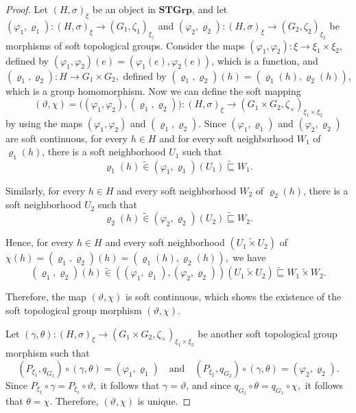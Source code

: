 \documentclass[preprint,12pt]{elsarticle}
\begin{document}
\begin{proof}
 Let $ (H, \sigma)_\xi $ be an object in $\mathbf{STGrp}$, and let $(\varphi_1, \varrho_1): (H, \sigma)_\xi\to (G_1,\zeta_1 )_{\xi_1}$ and $(\varphi_2, \varrho_2): (H, \sigma)_\xi \to (G_2,\zeta_2 )_{\xi_2}$ be morphisms of soft topological groups. Consider the maps
\(
(\varphi_1, \varphi_2) : \xi \to \xi_1 \times \xi_2,
\)
defined by
\(
(\varphi_1, \varphi_2)(e) = (\varphi_1(e), \varphi_2(e))
\), which is a function, and \(
(\varrho_1, \varrho_2) : H \to G_1 \times G_2,
\)
defined by
\(
(\varrho_1, \varrho_2)(h) = (\varrho_1(h), \varrho_2(h))
\), which is a group homomorphism.
Now we can define the soft mapping
\[
(\vartheta, \chi) = \big( (\varphi_1, \varphi_2), (\varrho_1, \varrho_2) \big) :( H, \sigma)_ \xi \to ( G_1 \times G_2, \zeta_\times)_ {\xi_1 \times \xi_2}
\] by using the maps $(\varphi_1, \varphi_2)$ and $(\varrho_1, \varrho_2)$.
Since $(\varphi_1, \varrho_1)$ and $(\varphi_2, \varrho_2)$ are soft continuous, for every \( h \in H \) and for every soft neighborhood \( W_1 \) of \( \varrho_1(h) \), there is a soft neighborhood \( U_1 \) such that
\[
\varrho_1(h)  \widetilde{\in}(\varphi_1, \varrho_1)(U_1)  \widetilde{\sqsubseteq}W_1.
\]

Similarly, for every \( h \in H \) and every soft neighborhood \( W_2 \) of \( \varrho_2(h) \), there is a soft neighborhood \( U_2 \) such that
\[
\varrho_2(h)  \widetilde{\in}(\varphi_2, \varrho_2)(U_2) \widetilde{\sqsubseteq }W_2.
\]

Hence, for every \( h \in H \) and every soft neighborhood \( (U_1\widetilde{\times} U_2) \) of
\(
\chi(h) = (\varrho_1, \varrho_2)(h) = (\varrho_1(h), \varrho_2(h)),
\)
we have
\[
(\varrho_1, \varrho_2)(h)  \widetilde{\in}((\varphi_1, \varrho_1), (\varphi_2, \varrho_2))(U_1\widetilde{\times} U_2)  \widetilde{\sqsubseteq } W_1\widetilde{\times} W_2.
\]

Therefore, the map \( (\vartheta, \chi) \) is soft continuous, which shows the existence of the soft topological group morphism \( (\vartheta, \chi) \).

Let \( (\gamma, \theta): ( H, \sigma)_ \xi \to ( G_1 \times G_2, \zeta_\times)_ {\xi_1 \times \xi_2} \)
be another soft topological group morphism such that
\[
(P_{\xi_1}, q_{G_1}) \circ (\gamma, \theta) = (\varphi_1, \varrho_1) \quad \text{and} \quad (P_{\xi_2}, q_{G_2}) \circ (\gamma, \theta) = (\varphi_2, \varrho_2).
\]
Since
\(
P_{\xi_1} \circ \gamma = P_{\xi_1} \circ \vartheta,
\)
it follows that \( \gamma = \vartheta \), and since
\(
q_{G_1} \circ \theta = q_{G_1} \circ \chi,
\)
it follows that \( \theta = \chi \).
Therefore, \( (\vartheta, \chi) \) is unique.


\end{proof}
\end{document}
